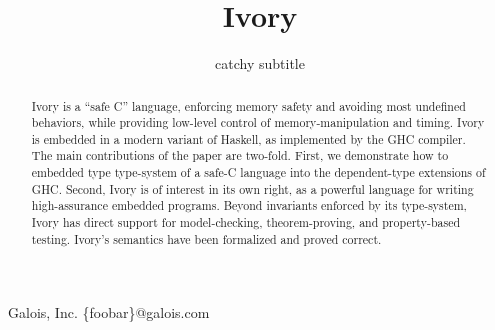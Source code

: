 \documentclass{sigplanconf}
\begin{document}
\setlength{\pdfpageheight}{\paperheight}
\setlength{\pdfpagewidth}{\paperwidth}

\copyrightdata{}
\doi{}



\permissiontopublish             %


\title{Ivory}
\subtitle{catchy subtitle}

           {Galois, Inc.}
           {\{foobar\}@galois.com}

\maketitle

\begin{abstract}
Ivory is a ``safe C'' language, enforcing memory safety and avoiding most
undefined behaviors, while providing low-level control of memory-manipulation
and timing. Ivory is embedded in a modern variant of Haskell, as implemented by
the GHC compiler. The main contributions of the paper are two-fold. First, we
demonstrate how to embedded type type-system of a safe-C language into the
dependent-type extensions of GHC. Second, Ivory is of interest in its own right,
as a powerful language for writing high-assurance embedded programs. Beyond
invariants enforced by its type-system, Ivory has direct support for
model-checking, theorem-proving, and property-based testing. Ivory's semantics
have been formalized and proved correct.
\end{abstract}


\end{document}
